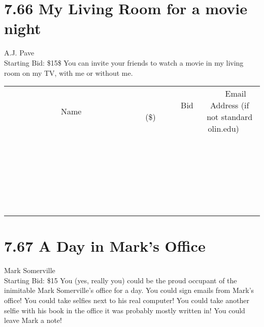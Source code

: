\documentclass[11pt]{article}
\begin{document}
\section*{7.66 My Living Room for a movie night}
A.J. Pave
\\
Starting Bid: \$15\$
\newline
You can invite your friends to watch a movie in my living room on my TV, with me or without me.
\\[6ex]
\begin{tabular}{c c c}
~~~~~~~~~~~~~Name~~~~~~~~~~~~~ & ~~~~~~~~~Bid (\$)~~~~~~~~~  & ~~~Email Address (if not standard olin.edu)~~~\\
 & & \\
\hline
 & & \\
\hline
 & & \\
\hline
 & & \\
\hline
 & & \\
\hline
 & & \\
\hline
 & & \\
\hline
 & & \\
\hline
 & & \\
\hline
 & & \\
\hline
 & & \\
\hline
 & & \\
\hline
 & & \\
\hline
 & & \\
\hline
 & & \\
\hline
 & & \\
\hline
 & & \\
\hline
 & & \\
\hline
 & & \\
\hline
 & & \\
\hline
 & & \\
\hline
 & & \\
\hline
 & & \\
\hline
 & & \\
\hline
 & & \\
\hline
 & & \\
\hline
\end{tabular}
\newpage
\section*{7.67 A Day in Mark's Office}
Mark Somerville
\\
Starting Bid: \$15
\newline
You (yes, really you) could be the proud occupant of the inimitable Mark Somerville's office for a day. You could sign emails from Mark's office! You could take selfies next to his real computer! You could take another selfie with his book in the office it was probably mostly written in! You could leave Mark a note! 
\end{document}
